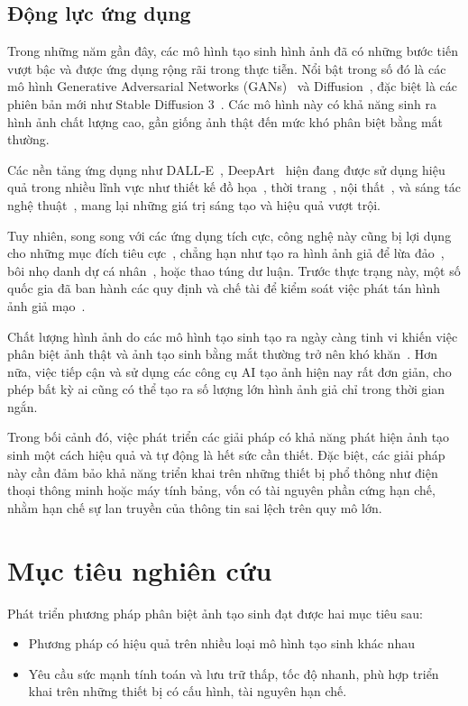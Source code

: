\subsection{Động lực ứng dụng}

Trong những năm gần đây, các mô hình tạo sinh hình ảnh đã có những bước tiến vượt bậc và được ứng dụng rộng rãi trong thực tiễn. Nổi bật trong số đó là các mô hình Generative Adversarial Networks (GANs)~\cite{Goodfellow2014GenerativeAN} và Diffusion~\cite{Ho2020DenoisingDP}, đặc biệt là các phiên bản mới như Stable Diffusion 3~\cite{Esser2024ScalingRF}. Các mô hình này có khả năng sinh ra hình ảnh chất lượng cao, gần giống ảnh thật đến mức khó phân biệt bằng mắt thường.

Các nền tảng ứng dụng như DALL-E~\cite{dalle2}, DeepArt~\cite{deepart} hiện đang được sử dụng hiệu quả trong nhiều lĩnh vực như thiết kế đồ họa~\cite{CasteleiroPitrez2024GenerativeAI,Shin2024CanPM}, thời trang~\cite{8769486}, nội thất~\cite{Chen2020ApplicationOA}, và sáng tác nghệ thuật~\cite{Ai_won_an_art_contest}, mang lại những giá trị sáng tạo và hiệu quả vượt trội.

Tuy nhiên, song song với các ứng dụng tích cực, công nghệ này cũng bị lợi dụng cho những mục đích tiêu cực~\cite{DBLP-abs-2107-10139}, chẳng hạn như tạo ra hình ảnh giả để lừa đảo~\cite{Ai_chief_financial_officer}, bôi nhọ danh dự cá nhân~\cite{VirginiaDeepfake}, hoặc thao túng dư luận. Trước thực trạng này, một số quốc gia đã ban hành các quy định và chế tài để kiểm soát việc phát tán hình ảnh giả mạo~\cite{CaliforniaDeepfakes}.

Chất lượng hình ảnh do các mô hình tạo sinh tạo ra ngày càng tinh vi khiến việc phân biệt ảnh thật và ảnh tạo sinh bằng mắt thường trở nên khó khăn~\cite{spottingai}. Hơn nữa, việc tiếp cận và sử dụng các công cụ AI tạo ảnh hiện nay rất đơn giản, cho phép bất kỳ ai cũng có thể tạo ra số lượng lớn hình ảnh giả chỉ trong thời gian ngắn.

Trong bối cảnh đó, việc phát triển các giải pháp có khả năng phát hiện ảnh tạo sinh một cách hiệu quả và tự động là hết sức cần thiết. Đặc biệt, các giải pháp này cần đảm bảo khả năng triển khai trên những thiết bị phổ thông như điện thoại thông minh hoặc máy tính bảng, vốn có tài nguyên phần cứng hạn chế, nhằm hạn chế sự lan truyền của thông tin sai lệch trên quy mô lớn.


\section{Mục tiêu nghiên cứu}
Phát triển phương pháp phân biệt ảnh tạo sinh đạt được hai mục tiêu sau:
\begin{itemize}
	\item Phương pháp có hiệu quả trên nhiều loại mô hình tạo sinh khác nhau
	\item Yêu cầu sức mạnh tính toán và lưu trữ thấp, tốc độ nhanh, phù hợp triển khai trên những thiết bị có cấu hình, tài nguyên hạn chế.
\end{itemize}

